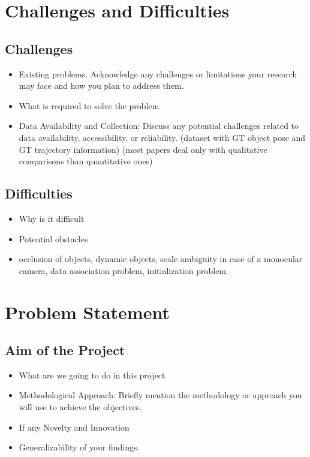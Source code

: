 \documentclass[report.tex]{subfiles}
\begin{document}
    \section{Challenges and Difficulties}
    \subsection{Challenges}
    \begin{itemize}
        \item Existing problems. Acknowledge any challenges or limitations your research may face and how you plan to address them.
        \item What is required to solve the problem
        \item Data Availability and Collection: Discuss any potential challenges related to data availability, accessibility, or reliability. (dataset with GT object pose and GT trajectory information) (most papers deal only with qualitative comparisons than quantitative ones)
    \end{itemize}

    \subsection{Difficulties}
    \begin{itemize}
        \item Why is it difficult
        \item Potential obstacles
        \item occlusion of objects, dynamic objects, scale ambiguity in case of a monocular camera, data association problem, initialization problem.
    \end{itemize}



    \section{Problem Statement}
    \subsection{Aim of the Project}
    \begin{itemize}
        \item What are we going to do in this project
        \item Methodological Approach: Briefly mention the methodology or approach you will use to achieve the objectives.
        \item If any Novelty and Innovation
        \item Generalizability of your findings.
    \end{itemize}
    
\end{document}
